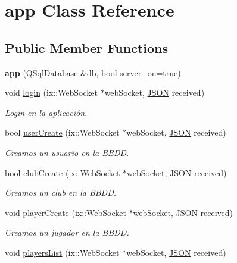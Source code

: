 \hypertarget{classapp}{}\section{app Class Reference}
\label{classapp}
\subsection*{Public Member Functions}
\begin{DoxyCompactItemize}
\item 
\mbox{\label{classapp_ad4bae55c0e3beb4a4c65b9e9d657ab59}} 
{\bfseries app} (Q\+Sql\+Database \&db, bool server\+\_\+on=true)
\item 
void \mbox{\hyperlink{classapp_a0bb96ab42618921392ac30e13444391c}{login}} (ix\+::\+Web\+Socket $\ast$web\+Socket, \mbox{\hyperlink{classnlohmann_1_1basic__json}{J\+S\+ON}} received)
\begin{DoxyCompactList}\small\item\em Login en la aplicación. \end{DoxyCompactList}\item 
bool \mbox{\hyperlink{classapp_a6642515de9db6d78f89d3969553be999}{user\+Create}} (ix\+::\+Web\+Socket $\ast$web\+Socket, \mbox{\hyperlink{classnlohmann_1_1basic__json}{J\+S\+ON}} received)
\begin{DoxyCompactList}\small\item\em Creamos un usuario en la B\+B\+DD. \end{DoxyCompactList}\item 
bool \mbox{\hyperlink{classapp_afb7363d3bc58746f8c71425ba6050db1}{club\+Create}} (ix\+::\+Web\+Socket $\ast$web\+Socket, \mbox{\hyperlink{classnlohmann_1_1basic__json}{J\+S\+ON}} received)
\begin{DoxyCompactList}\small\item\em Creamos un club en la B\+B\+DD. \end{DoxyCompactList}\item 
void \mbox{\hyperlink{classapp_a6f44f304590371aa8aae2a2e7b504a64}{player\+Create}} (ix\+::\+Web\+Socket $\ast$web\+Socket, \mbox{\hyperlink{classnlohmann_1_1basic__json}{J\+S\+ON}} received)
\begin{DoxyCompactList}\small\item\em Creamos un jugador en la B\+B\+DD. \end{DoxyCompactList}\item 
void \mbox{\hyperlink{classapp_aeddfad0a193f1b1c8581d31977ff4c10}{players\+List}} (ix\+::\+Web\+Socket $\ast$web\+Socket, \mbox{\hyperlink{classnlohmann_1_1basic__json}{J\+S\+ON}} received)

\end{DoxyCompactItemize}
